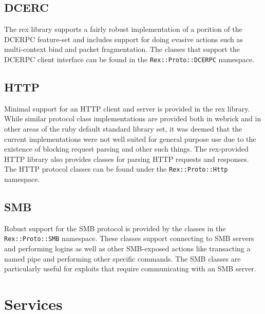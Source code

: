 \documentclass{report}
\begin{document}
        \subsection{DCERC}

\par
The rex library supports a fairly robust implementation of a
porition of the DCERPC feature-set and includes support for doing
evasive actions such as multi-context bind and packet fragmentation.
The classes that support the DCERPC client interface can be found in
the \texttt{Rex::Proto::DCERPC} namespace.

        \subsection{HTTP}

\par
Minimal support for an HTTP client and server is provided in the rex
library.  While similar protocol class implementations are provided
both in webrick and in other areas of the ruby default standard
library set, it was deemed that the current implementations were not
well suited for general purpose use due to the existence of blocking
request parsing and other such things.  The rex-provided HTTP
library also provides classes for parsing HTTP requests and
responses.  The HTTP protocol classes can be found under the
\texttt{Rex::Proto::Http} namespace.

        \subsection{SMB}

\par
Robust support for the SMB protocol is provided by the classes in
the \texttt{Rex::Proto::SMB} namespace.  These classes support
connecting to SMB servers and performing logins as well as other
SMB-exposed actions like transacting a named pipe and performing
other specific commands.  The SMB classes are particularly useful
for exploits that require communicating with an SMB server.

    \section{Services}
\end{document}
